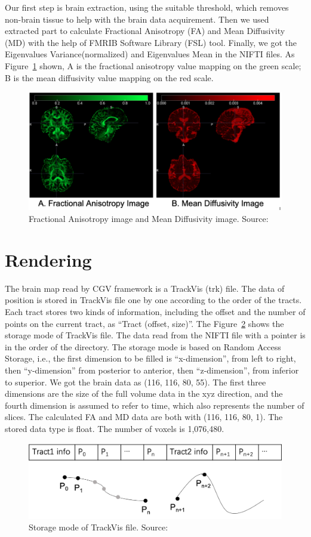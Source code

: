 \documentclass[a4paper, 12pt]{report}
\begin{document}
Our first step is brain extraction, using the suitable threshold, which removes non-brain tissue to help with the brain data acquirement. Then we used extracted part to calculate Fractional Anisotropy (FA) and Mean Diffusivity (MD) with the help of FMRIB Software Library (FSL) tool. Finally, we got the Eigenvalues Variance(normalized) and Eigenvalues Mean in the NIFTI files. As Figure~\ref{fig:3} shown, A is the fractional anisotropy value mapping on the green scale; B is the mean diffusivity value mapping on the red scale.
\begin{figure}[ht]
    \centering
    \includegraphics[width = 0.7\columnwidth]{3}
    \caption{ Fractional Anisotropy image and Mean Diffusivity image. Source:  \cite{???}}
    \label{fig:3}
\end{figure}	

\section{Rendering}

The brain map read by CGV framework is a TrackVis (trk) file. The data of position is stored in TrackVis file one by one according to the order of the tracts.  Each tract stores two kinds of information, including the offset and the number of points on the current tract, as “Tract (offset, size)”. The Figure~\ref{fig:4} shows the storage mode of TrackVis file. The data read from the NIFTI file with a pointer is in the order of the directory. The storage mode is based on Random Access Storage, i.e., the first dimension to be filled is “x-dimension”, from left to right, then “y-dimension” from posterior to anterior, then “z-dimension”, from inferior to superior. We got the brain data as (116, 116, 80, 55). The first three dimensions are the size of the full volume data in the xyz direction, and the fourth dimension is assumed to refer to time, which also represents the number of slices. The calculated FA and MD data are both with (116, 116, 80, 1). The stored data type is float. The number of voxels is 1,076,480.

\begin{figure}[ht]
    \centering
    \includegraphics[width = 0.8\columnwidth]{4}
    \caption{Storage mode of TrackVis file. Source:  \cite{???}}
    \label{fig:4}
\end{figure}	
\end{document}
